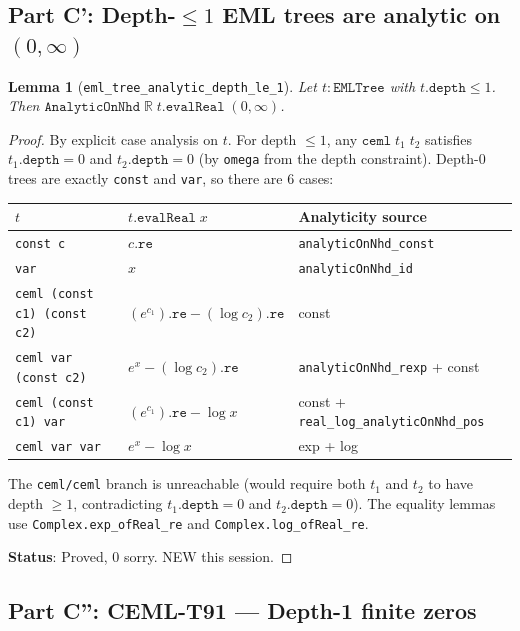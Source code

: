 \documentclass[12pt]{article}
\newtheorem{lemma}[theorem]{Lemma}
\theoremstyle{definition}
\begin{document}
\subsection{Part C': Depth-$\leq 1$ EML trees are analytic on $(0,\infty)$}

\begin{lemma}[\texttt{eml\_tree\_analytic\_depth\_le\_1}]
Let $t : \texttt{EMLTree}$ with $t.\texttt{depth} \leq 1$.
Then $\texttt{AnalyticOnNhd}\;\mathbb{R}\;t.\texttt{evalReal}\;(0,\infty)$.
\end{lemma}
\begin{proof}
By explicit case analysis on $t$.  For depth $\leq 1$, any $\texttt{ceml}\;t_1\;t_2$ satisfies
$t_1.\texttt{depth} = 0$ and $t_2.\texttt{depth} = 0$ (by \texttt{omega} from the depth constraint).
Depth-0 trees are exactly \texttt{const} and \texttt{var}, so there are 6 cases:

\begin{center}
\begin{tabular}{lll}
\toprule
$t$ & $t.\texttt{evalReal}\;x$ & Analyticity source \\
\midrule
\texttt{const c} & $c.\texttt{re}$ & \texttt{analyticOnNhd\_const} \\
\texttt{var} & $x$ & \texttt{analyticOnNhd\_id} \\
\texttt{ceml (const c1) (const c2)} & $(e^{c_1}).\texttt{re} - (\log c_2).\texttt{re}$ & const \\
\texttt{ceml var (const c2)} & $e^x - (\log c_2).\texttt{re}$ & \texttt{analyticOnNhd\_rexp} + const \\
\texttt{ceml (const c1) var} & $(e^{c_1}).\texttt{re} - \log x$ & const + \texttt{real\_log\_analyticOnNhd\_pos} \\
\texttt{ceml var var} & $e^x - \log x$ & exp + log \\
\bottomrule
\end{tabular}
\end{center}

The \texttt{ceml/ceml} branch is unreachable (would require both $t_1$ and $t_2$ to have depth $\geq 1$,
contradicting $t_1.\texttt{depth} = 0$ and $t_2.\texttt{depth} = 0$).
The equality lemmas use \texttt{Complex.exp\_ofReal\_re} and \texttt{Complex.log\_ofReal\_re}.

\textbf{Status}: \textcolor{proved}{Proved, 0 sorry. NEW this session.}
\end{proof}

\subsection{Part C'': CEML-T91 — Depth-1 finite zeros}
\end{document}
